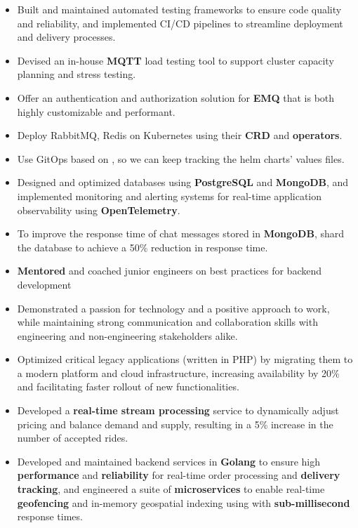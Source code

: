 \vspace{0.5cm}
\begin{itemize}
  \item Built and maintained automated testing frameworks to ensure code quality and reliability,
        and implemented CI/CD pipelines to streamline deployment and delivery processes.
  \item Devised an in-house \textbf{MQTT} load testing tool to support cluster capacity planning and stress testing.
  \item Offer an authentication and authorization solution for \textbf{EMQ} that is both highly customizable and performant.
  \item Deploy RabbitMQ, Redis on Kubernetes using their \textbf{CRD} and \textbf{operators}.
  \item Use GitOps based on , so we can keep tracking the helm charts' values files.
  \item Designed and optimized databases using \textbf{PostgreSQL} and \textbf{MongoDB},
        and implemented monitoring and alerting systems for real-time application observability using \textbf{OpenTelemetry}.
  \item To improve the response time of chat messages stored in \textbf{MongoDB}, shard the database to achieve a 50\% reduction in response time.
  \item \textbf{Mentored} and coached junior engineers on best practices for backend development
  \item Demonstrated a passion for technology and a positive approach to work,
        while maintaining strong communication and collaboration skills with engineering
        and non-engineering stakeholders alike.
\end{itemize}

\vspace{1cm}

\vspace{0.5cm}
\begin{itemize}
  \item Optimized critical legacy applications (written in PHP) by migrating them to a modern platform and cloud infrastructure,
        increasing availability by 20\% and facilitating faster rollout of new functionalities.
  \item Developed a \textbf{real-time stream processing} service to dynamically adjust pricing and balance demand and supply,
        resulting in a 5\% increase in the number of accepted rides.
  \item Developed and maintained backend services in \textbf{Golang} to ensure
        high \textbf{performance} and \textbf{reliability} for real-time order processing and \textbf{delivery tracking},
        and engineered a suite of \textbf{microservices} to enable real-time \textbf{geofencing} and in-memory geospatial
        indexing using  with \textbf{sub-millisecond} response times.
\end{itemize}

